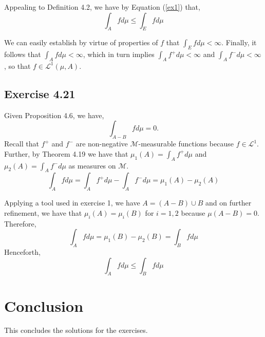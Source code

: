 \documentclass[12pt]{article}
\begin{document}
Appealing to Definition 4.2, we have by Equation (\ref{ex1}) that,
\begin{equation}
\int_A f d\mu \leq \int_E f d\mu 
\end{equation}

We can easily establish by virtue of properties of $f$ that $\int_E f d\mu <\infty$. Finally, it follows that $\int_A f d\mu < \infty$, which in turn implies $\int_A f^+ d\mu < \infty$ and $\int_A f^{-} d\mu < \infty$, so that $f \in \mathscr{L}^1 (\mu, A)$.

\subsection{Exercise 4.21}
Given Proposition 4.6, we have,
\begin{equation}
\int_{A-B} f d\mu = 0.
\end{equation}
Recall that $f^+$ and $f^-$ are non-negative $\mathcal{M}$-measurable functions because $f \in \mathscr{L}^1$. Further, by Theorem 4.19 we have that  $\mu_1(A) =  \int_A f^+ d\mu$ and $\mu_2(A) = \int_A f^- d\mu$ as measures on $\mathcal{M}$. 
\begin{equation}
\int_A f d\mu =  \int_A f^+ d\mu -  \int_A f^- d\mu = \mu_1(A) - \mu_2(A)
\end{equation}

Applying a tool used in exercise 1, we have $A = (A - B) \cup B$ and on further refinement, we have that $\mu_i(A) = \mu_i (B)$ for $i=1,2$ because $\mu(A - B) = 0$. Therefore,
\begin{equation}
\int_A f d\mu = \mu_1(B) - \mu_2(B) = \int_B f d\mu
\end{equation}
Henceforth,
\begin{equation}
\int_A f d\mu \leq \int_{B} f d\mu
\end{equation}

\section{Conclusion}

This concludes the solutions for the exercises. 
\end{document}
